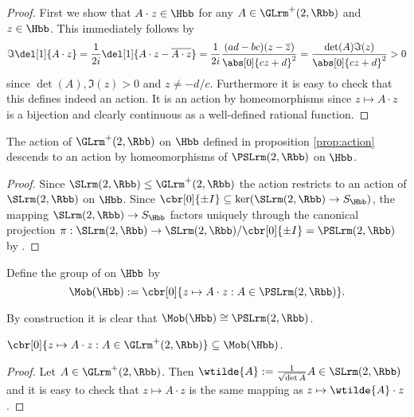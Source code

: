 \begin{proof}
	First we show that $A \cdot z \in \Hbb$ for any $A \in \GLrm^+(2,\Rbb)$ and $z \in \Hbb$. This immediately follows by
	\begin{equation}
\Im\del[1]{A \cdot z} = \frac{1}{2i}\del[1]{A \cdot z - \overline{A \cdot z}} = \frac{1}{2i}\frac{(ad - bc)(z - \overline{z})}{\abs[0]{cz + d}^2} = \frac{\det(A)\Im(z)}{\abs[0]{cz + d}^2} > 0
		\label{eq:imaginary_part}
	\end{equation}
	\noindent since $\det(A),\Im(z) > 0$ and $z \neq -d/c$. Furthermore it is easy to check that this defines indeed an action. It is an action by homeomorphisms since $z \mapsto A \cdot z$ is a bijection and clearly continuous as a well-defined rational function. 
\end{proof}

\begin{corollary}
	The action of $\GLrm^+(2,\Rbb)$ on $\Hbb$ defined in proposition \ref{prop:action} descends to an action by homeomorphisms of $\PSLrm(2,\Rbb)$ on $\Hbb$.
\end{corollary}

\begin{proof}
	Since $\SLrm(2,\Rbb) \leq \GLrm^+(2,\Rbb)$ the action restricts to an action of $\SLrm(2,\Rbb)$ on $\Hbb$. Since $\cbr[0]{\pm I} \subseteq \ker(\SLrm(2,\Rbb) \to S_\Hbb)$, the mapping $\SLrm(2,\Rbb) \to S_\Hbb$ factors uniquely through the canonical projection $\pi : \SLrm(2,\Rbb) \to \SLrm(2,\Rbb)/\cbr[0]{\pm I} = \PSLrm(2,\Rbb)$ by \cite[23]{grillet:abstract_algebra:2007}.	
\end{proof}

\begin{definition}
	Define the group of  on $\Hbb$ by
	\begin{equation}
		\Mob(\Hbb) := \cbr[0]{z \mapsto A \cdot z : A \in \PSLrm(2,\Rbb)}.
	\end{equation}
\end{definition}

\begin{remark}
	By construction it is clear that $\Mob(\Hbb) \cong \PSLrm(2,\Rbb)$.
\end{remark}

\begin{proposition}
	$\cbr[0]{z \mapsto A \cdot z : A \in \GLrm^+(2,\Rbb)} \subseteq \Mob(\Hbb)$.
\end{proposition}

\begin{proof}
	Let $A \in \GLrm^+(2,\Rbb)$. Then $\wtilde{A} := \frac{1}{\sqrt{\det A}}A \in \SLrm(2,\Rbb)$ and it is easy to check that $z \mapsto A \cdot z$ is the same mapping as $z \mapsto \wtilde{A} \cdot z$.
\end{proof}

